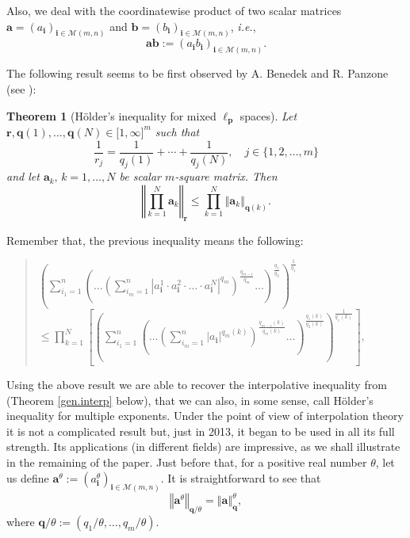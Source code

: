 \documentclass[10pt]{amsart}
\newtheorem{theorem}{Theorem}[section]
\numberwithin{equation}{section}
\begin{document}
Also, we deal with the coordinatewise product of two scalar matrices $\mathbf{a}=\left( a_{\mathbf{i}}\right) _{\mathbf{i}\in \mathcal{M}(m,n)}$
and $\mathbf{b}=\left( b_{\mathbf{i}}\right) _{\mathbf{i}\in \mathcal{M}(m,n)}$, \emph{i.e.},
\begin{equation*}
\mathbf{a}\mathbf{b}:=\left( a_{\mathbf{i}}b_{\mathbf{i}}\right) _{\mathbf{i}\in \mathcal{M}(m,n)}.
\end{equation*}

The following result seems to be first observed by A. Benedek and R. Panzone
(see \cite{bene}):

\begin{theorem}[H\"{o}lder's inequality for mixed $\ell _{\mathbf{p}}$ spaces]
\label{GenHol} Let $\mathbf{r},\mathbf{q}(1),\dots ,\mathbf{q}(N)\in \lbrack
1, \infty ]^{m}$ such that
\begin{equation*}
\frac{1}{r_{j}}=\frac{1}{q_{j}(1)}+\cdots +\frac{1}{q_{j}(N)}, \quad j \in
\{1, 2, \ldots, m\}
\end{equation*}and let $\mathbf{a}_{k},\,k=1,\dots ,N$ be scalar $m$-square matrix. Then
\begin{equation*}
\left\Vert \prod_{k=1}^{N}\mathbf{a}_{k}\right\Vert _{\mathbf{r}}\leq
\prod_{k=1}^{N}\left\Vert \mathbf{a}_{k}\right\Vert _{\mathbf{q}(k)}.
\end{equation*}
\end{theorem}

Remember that, the previous inequality means the following:

\begin{quote}
{\small $\displaystyle
\left( \sum_{i_{1}=1}^{n}\left( \dots \left( \sum_{i_{m}=1}^{n} |a_{\mathbf{i}}^1 \cdot a_{\mathbf{i}}^2 \cdot \ldots \cdot a_{\mathbf{i}}^N|^{q_{m}}\right) ^{\frac{q_{m-1}}{q_{m}}}\dots \right) ^{\frac{q_{1}}{q_{2}}}\right) ^{\frac{1}{q_{1}}}$\newline
$\displaystyle \leq \prod_{k=1}^{N}\left[ \left( \sum_{i_{1}=1}^{n}\left(
\dots \left( \sum_{i_{m}=1}^{n}|a_{\mathbf{i}}|^{q_{m}(k)}\right) ^{\frac{q_{m-1}(k)}{q_{m}(k)}}\dots \right) ^{\frac{q_{1}(k)}{q_{2}(k)}}\right) ^{\frac{1}{q_{1}(k)}}\right], $ }
\end{quote}

Using the above result we are able to recover the interpolative inequality
from \cites{alb, bps, n, joedson} (Theorem \ref{gen.interp} below), that we
can also, in some sense, call H\"{o}lder's inequality for multiple
exponents. Under the point of view of interpolation theory it is not a
complicated result but, just in 2013, it began to be used in all its full
strength. Its applications (in different fields) are impressive, as we shall
illustrate in the remaining of the paper. Just before that, for a positive
real number $\theta $, let us define $\mathbf{a}^{\theta}:=\left( a_{\mathbf{i}}^{\theta }\right) _{\mathbf{i}\in \mathcal{M}(m,n)}$. It is
straightforward to see that
\begin{equation*}
\left\Vert \mathbf{a}^{\theta }\right\Vert _{\mathbf{q}/\theta }=\left\Vert
\mathbf{a}\right\Vert _{\mathbf{q}}^{\theta },
\end{equation*}where $\mathbf{q}/\theta :=\left( q_{1}/\theta ,\dots ,q_{m}/\theta \right) $.
\end{document}
